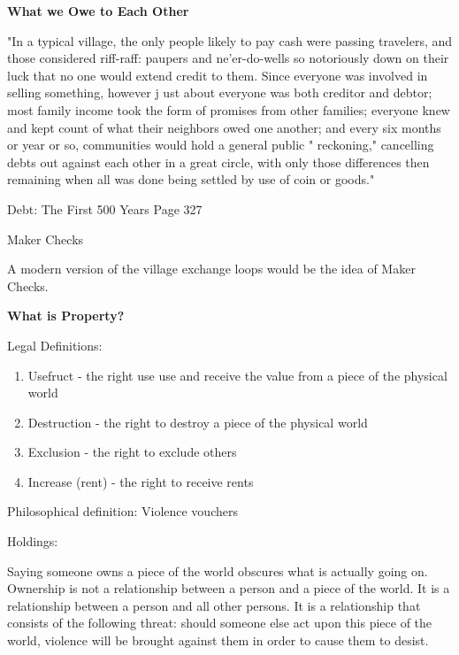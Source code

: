 \documentclass{article}
\begin{document}
\pagebreak
{\huge \textbf{What we Owe to Each Other}}


"In a typical village, the only people likely to pay cash were passing
travelers, and those considered riff-raff: paupers and ne'er-do-wells so
notoriously down on their luck that no one would extend credit to
them. Since everyone was involved in selling something, however j ust
about everyone was both creditor and debtor; most family income took
the form of promises from other families; everyone knew and kept
count of what their neighbors owed one another; and every six months
or year or so, communities would hold a general public " reckoning,"
cancelling debts out against each other in a great circle, with only those
differences then remaining when all was done being settled by use of
coin or goods."

Debt: The First 500 Years Page 327

\large Maker Checks

A modern version of the village exchange loops would be the idea of Maker Checks. 




\pagebreak
{\huge \textbf{What is Property?}}

\large Legal Definitions:

\begin{enumerate}
	
	\item Usefruct - the right use use and receive the value from a piece of the physical world

	\item Destruction - the right to destroy a piece of the physical world

	\item Exclusion -  the right to exclude others
 
	\item Increase (rent) - the right to receive rents
\end{enumerate}
	
\large Philosophical definition: Violence vouchers

\large Holdings:

Saying someone owns a piece of the world obscures what is actually going on. Ownership is not a relationship between a person and a piece of the world. It is a relationship between a person and all other persons. It is a relationship that consists of the following threat: should someone else act upon this piece of the world, violence will be brought against them in order to cause them to desist.
\end{document}
